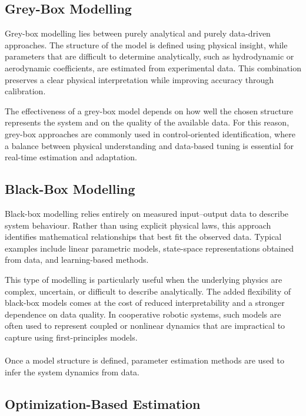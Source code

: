 \subsection{Grey-Box Modelling}

Grey-box modelling lies between purely analytical and purely data-driven approaches. The structure of the model is defined using physical insight, while parameters that are difficult to determine analytically, such as hydrodynamic or aerodynamic coefficients, are estimated from experimental data. This combination preserves a clear physical interpretation while improving accuracy through calibration.

The effectiveness of a grey-box model depends on how well the chosen structure represents the system and on the quality of the available data. For this reason, grey-box approaches are commonly used in control-oriented identification, where a balance between physical understanding and data-based tuning is essential for real-time estimation and adaptation.


\subsection{Black-Box Modelling}

Black-box modelling relies entirely on measured input--output data to describe system behaviour. Rather than using explicit physical laws, this approach identifies mathematical relationships that best fit the observed data. Typical examples include linear parametric models, state-space representations obtained from data, and learning-based methods.

This type of modelling is particularly useful when the underlying physics are complex, uncertain, or difficult to describe analytically. The added flexibility of black-box models comes at the cost of reduced interpretability and a stronger dependence on data quality. In cooperative robotic systems, such models are often used to represent coupled or nonlinear dynamics that are impractical to capture using first-principles models.

\paragraph{}

Once a model structure is defined, parameter estimation methods are used to infer the system dynamics from data. 

\subsection{Optimization-Based Estimation}

